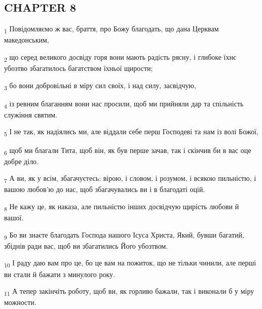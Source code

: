 \subsection{CHAPTER 8}
\begin{tcolorbox}
\textsubscript{1} Повідомляємо ж вас, браття, про Божу благодать, що дана Церквам македонським,
\end{tcolorbox}
\begin{tcolorbox}
\textsubscript{2} що серед великого досвіду горя вони мають радість рясну, і глибоке їхнє убозтво збагатилось багатством їхньої щирости;
\end{tcolorbox}
\begin{tcolorbox}
\textsubscript{3} бо вони добровільні в міру сил своїх, і над силу, засвідчую,
\end{tcolorbox}
\begin{tcolorbox}
\textsubscript{4} із ревним благанням вони нас просили, щоб ми прийняли дар та спільність служіння святим.
\end{tcolorbox}
\begin{tcolorbox}
\textsubscript{5} І не так, як надіялись ми, але віддали себе перш Господеві та нам із волі Божої,
\end{tcolorbox}
\begin{tcolorbox}
\textsubscript{6} щоб ми благали Тита, щоб він, як був перше зачав, так і скінчив би в вас оце добре діло.
\end{tcolorbox}
\begin{tcolorbox}
\textsubscript{7} А ви, як у всім, збагачуєтесь: вірою, і словом, і розумом, і всякою пильністю, і вашою любов'ю до нас, щоб збагачувались ви і в благодаті оцій.
\end{tcolorbox}
\begin{tcolorbox}
\textsubscript{8} Не кажу це, як наказа, але пильністю інших досвідчую щирість любови й вашої.
\end{tcolorbox}
\begin{tcolorbox}
\textsubscript{9} Бо ви знаєте благодать Господа нашого Ісуса Христа, Який, бувши багатий, збіднів ради вас, щоб ви збагатились Його убозтвом.
\end{tcolorbox}
\begin{tcolorbox}
\textsubscript{10} І раду даю вам про це, бо це вам на пожиток, що не тільки чинили, але перші ви стали й бажати з минулого року.
\end{tcolorbox}
\begin{tcolorbox}
\textsubscript{11} А тепер закінчіть роботу, щоб ви, як горливо бажали, так і виконали б у міру можности.
\end{tcolorbox}
